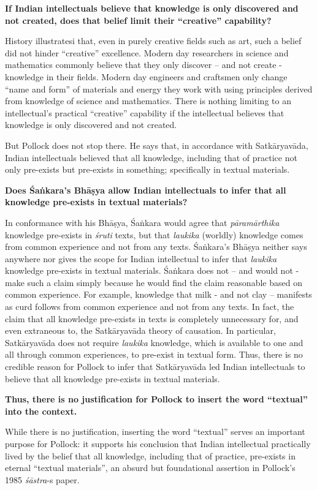 \textbf{If Indian intellectuals believe that knowledge is only discovered and not created, does that belief limit their ``creative'' capability?}

History illustratesi that, even in purely creative fields such as art, such a belief did not hinder ``creative'' excellence.  Modern day researchers in science and mathematics commonly believe that they only discover -- and not create - knowledge in their fields.  Modern day engineers and craftsmen only change ``name and form'' of materials and energy they work with using principles derived from knowledge of science and mathematics. There is nothing limiting to an intellectual's practical ``creative'' capability if the intellectual believes that knowledge is only discovered and not created.

But Pollock does not stop there.  He says that, in accordance with Satkāryavāda, Indian intellectuals believed that all knowledge, including that of practice not only pre-exists but pre-exists in something; specifically in textual materials.

\textbf{Does Śaṅkara's Bhāṣya allow Indian intellectuals to infer that all knowledge pre-exists in textual materials?}

In conformance with his Bhāṣya, Śaṅkara would agree that {\sl pāramārthika} knowledge pre-exists in {\sl śruti} texts, but that {\sl laukika} (worldly) knowledge comes from common experience and not from any texts. Śaṅkara's Bhāṣya neither says anywhere nor gives the scope for Indian intellectual to infer that {\sl laukika} knowledge pre-exists in textual materials.  Śaṅkara does not -- and would not - make such a claim simply because he would find the claim reasonable based on common experience. For example, knowledge that milk - and not clay -- manifests as curd follows from common experience and not from any texts. In fact, the claim that all knowledge pre-exists in texts is completely unnecessary for, and even extraneous to, the Satkāryavāda theory of causation. In particular, Satkāryavāda does not require {\sl laukika} knowledge, which is available to one and all through common experiences, to pre-exist in textual form. Thus, there is no credible reason for Pollock to infer that Satkāryavāda led Indian intellectuals to believe that all knowledge pre-exists in textual materials.

\textbf{Thus, there is no justification for Pollock to insert the word ``textual'' into the context.}

While there is no justification, inserting the word ``textual'' serves an important purpose for Pollock: it supports his conclusion that Indian intellectual practically lived by the belief that all knowledge, including that of practice, pre-exists in eternal ``textual materials'', an absurd but foundational assertion in Pollock's 1985 {\sl śāstra}-s paper.


